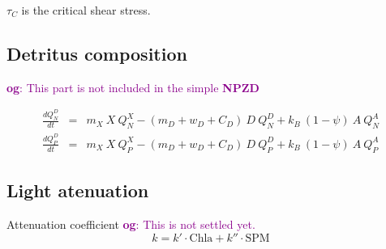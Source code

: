 \documentclass[fleqn]{article}                     %
\newcommand{\comment}[3][darkmagenta]{\textcolor{#1}{\textbf{#2}: #3}}
\begin{document}
$\tau_C$ is the critical shear stress.

\subsection{Detritus composition}
\comment{og}{This part is not included in the simple \textbf{NPZD}}

\begin{eqnarray}
  \frac{dQ^D_N}{dt} &=&  m_X\ X\ Q^X_N - (m_D + w_D + C_D)\ D\ Q^D_N + k_B\ (1-\psi)\ A\ Q^A_N \\
  \frac{dQ^D_P}{dt} &=& m_X\ X\ Q^X_P - (m_D + w_D + C_D)\ D\ Q^D_P + k_B\ (1-\psi)\ A\ Q^A_P
\end{eqnarray}

\subsection{Light atenuation}
Attenuation coefficient
\comment{og}{This is not settled yet.}
\begin{equation}
  k = k'\cdot \textrm{Chla} + k'' \cdot \textrm{SPM}
\end{equation}
\end{document}
